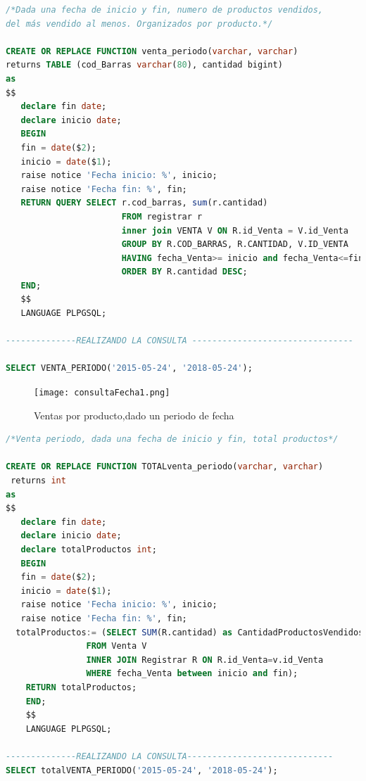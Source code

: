 \documentclass[30pt,fleqn]{article}
\begin{document}
\begin{lstlisting}[language=sql, caption={Consulta periodo fecha por producto}]
/*Dada una fecha de inicio y fin, numero de productos vendidos, 
del más vendido al menos. Organizados por producto.*/

CREATE OR REPLACE FUNCTION venta_periodo(varchar, varchar) 
returns TABLE (cod_Barras varchar(80), cantidad bigint)
as
$$
   declare fin date;
   declare inicio date;
   BEGIN 
   fin = date($2);
   inicio = date($1);
   raise notice 'Fecha inicio: %', inicio;
   raise notice 'Fecha fin: %', fin;
   RETURN QUERY SELECT r.cod_barras, sum(r.cantidad)
                       FROM registrar r 
					   inner join VENTA V ON R.id_Venta = V.id_Venta
					   GROUP BY R.COD_BARRAS, R.CANTIDAD, V.ID_VENTA
					   HAVING fecha_Venta>= inicio and fecha_Venta<=fin
					   ORDER BY R.cantidad DESC;		   
   END;
   $$
   LANGUAGE PLPGSQL;
		
--------------REALIZANDO LA CONSULTA --------------------------------

SELECT VENTA_PERIODO('2015-05-24', '2018-05-24');

\end{lstlisting}

\vspace{5mm} %

\begin{figure}[h]
    \centering
    \texttt{[image: consultaFecha1.png]}
    \caption{Ventas por producto,dado un periodo de fecha}
    \label{fig:Ventas por producto,dado un periodo de fecha}
\end{figure}

\vspace{15mm} %


\begin{lstlisting}[language=sql, caption={Consulta periodo fecha de productos totales vendidos}]
/*Venta periodo, dada una fecha de inicio y fin, total productos*/

CREATE OR REPLACE FUNCTION TOTALventa_periodo(varchar, varchar) 
 returns int
as
$$
   declare fin date;
   declare inicio date;
   declare totalProductos int;
   BEGIN 
   fin = date($2);
   inicio = date($1);   
   raise notice 'Fecha inicio: %', inicio;
   raise notice 'Fecha fin: %', fin;   
  totalProductos:= (SELECT SUM(R.cantidad) as CantidadProductosVendidos
				FROM Venta V
				INNER JOIN Registrar R ON R.id_Venta=v.id_Venta
				WHERE fecha_Venta between inicio and fin);		   
   	RETURN totalProductos;
   	END;
	$$
	LANGUAGE PLPGSQL;
	
--------------REALIZANDO LA CONSULTA-----------------------------
SELECT totalVENTA_PERIODO('2015-05-24', '2018-05-24');


\end{lstlisting}
\end{document}
